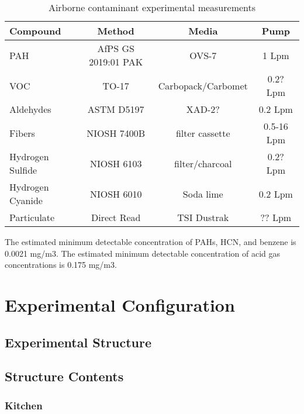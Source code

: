 \documentclass[12pt,oneside]{book}
\begin{document}
\begin{table}[!ht]
	\centering
	\caption{Airborne contaminant experimental measurements}
	\begin{tabular}{lccc}
		\toprule[1.5pt]
		Compound & Method & Media & Pump \\
		\midrule
		PAH   				& AfPS GS 2019:01 PAK   & OVS-7     		& 1 Lpm     \\
		VOC    				& TO-17     			& Carbopack/Carbomet& 0.2? Lpm    \\
		Aldehydes   	 	& ASTM D5197		    & XAD-2?   			& 0.2 Lpm    \\
		Fibers    			& NIOSH 7400B      		& filter cassette 	& 0.5-16 Lpm   \\
		Hydrogen Sulfide  	& NIOSH 6103		    & filter/charcoal	& 0.2? Lpm     \\
		Hydrogen Cyanide   	& NIOSH 6010		    & Soda lime			& 0.2 Lpm    \\
		Particulate   		& Direct Read     		& TSI Dustrak 		& ?? Lpm    \\
		\bottomrule[1.25pt]
	\end{tabular}
\end{table}
The estimated minimum detectable concentration of PAHs, HCN, and benzene  is  0.0021 mg/m3.
The estimated minimum detectable concentration of acid gas concentrations is 0.175 mg/m3.


\chapter{Experimental Configuration}
\label{chap:exp_config}

\section{Experimental Structure}


\section{Structure Contents}


\subsection{Kitchen}
\end{document}
